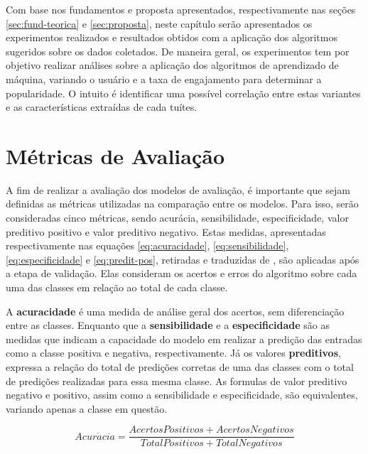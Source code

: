 \documentclass[oneside,openright,12pt]{ufsm_2015} %
\begin{document}
    \par Com base nos fundamentos e proposta apresentados, respectivamente nas seções \ref{sec:fund-teorica} e \ref{sec:proposta}, neste capítulo serão apresentados os experimentos realizados e resultados obtidos com a aplicação dos algoritmos sugeridos sobre os dados coletados. De maneira geral, os experimentos tem por objetivo realizar análises sobre a aplicação dos algoritmos de aprendizado de máquina, variando o usuário e a taxa de engajamento para determinar a popularidade. O intuito é identificar uma possível correlação entre estas variantes e as características extraídas de cada tuítes.
    

\section{Métricas de Avaliação}
\label{sec:class-metricas}

    \par A fim de realizar a avaliação dos modelos de avaliação, é importante que sejam definidas as métricas utilizadas na comparação entre os modelos. Para isso, serão consideradas cinco métricas, sendo acurácia, sensibilidade, especificidade, valor preditivo positivo e valor preditivo negativo. Estas medidas, apresentadas respectivamente nas equações \ref{eq:acuracidade}, \ref{eq:sensibilidade}, \ref{eq:especificidade} e \ref{eq:predit-pos}, retiradas e traduzidas de \cite{book:han:11}, são aplicadas após a etapa de validação. Elas consideram os acertos e erros do algoritmo sobre cada uma das classes em relação ao total de cada classe.
    
    \par A \textbf{acuracidade} é uma medida de análise geral dos acertos, sem diferenciação entre as classes. Enquanto que a \textbf{sensibilidade} e a \textbf{especificidade} são as medidas que indicam a capacidade do modelo em realizar a predição das entradas como a classe positiva e negativa, respectivamente. Já os valores \textbf{preditivos}, expressa a relação do total de predições corretas de uma das classes com o total de predições realizadas para essa mesma classe. As formulas de valor preditivo negativo e positivo, assim como a sensibilidade e especificidade, são equivalentes, variando apenas a classe em questão.
    
    \begin{equation} \label{eq:acuracidade}
    Acur\acute{a}cia = \frac{AcertosPositivos + AcertosNegativos}{TotalPositivos + TotalNegativos}
    \end{equation}
    
\end{document}
